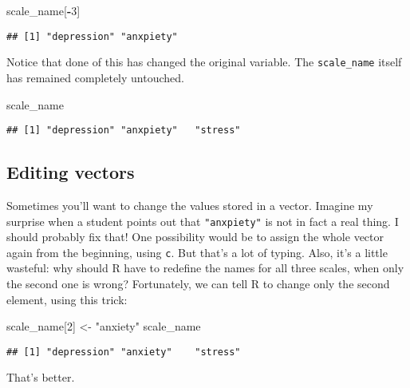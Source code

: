 \documentclass[]{book}
\newenvironment{Shaded}{\begin{snugshade}}{\end{snugshade}}
\newcommand{\DecValTok}[1]{\textcolor[rgb]{0.00,0.00,0.81}{#1}}
\newcommand{\NormalTok}[1]{#1}
\newcommand{\OperatorTok}[1]{\textcolor[rgb]{0.81,0.36,0.00}{\textbf{#1}}}
\newcommand{\StringTok}[1]{\textcolor[rgb]{0.31,0.60,0.02}{#1}}
\begin{document}
\begin{Shaded}
\begin{Highlighting}[]
\NormalTok{scale_name[}\OperatorTok{-}\DecValTok{3}\NormalTok{]}
\end{Highlighting}
\end{Shaded}

\begin{verbatim}
## [1] "depression" "anxpiety"
\end{verbatim}

Notice that done of this has changed the original variable. The \texttt{scale\_name} itself has remained completely untouched.

\begin{Shaded}
\begin{Highlighting}[]
\NormalTok{scale_name}
\end{Highlighting}
\end{Shaded}

\begin{verbatim}
## [1] "depression" "anxpiety"   "stress"
\end{verbatim}

\hypertarget{editing-vectors}{%
\subsection{Editing vectors}\label{editing-vectors}}

Sometimes you'll want to change the values stored in a vector. Imagine my surprise when a student points out that \texttt{"anxpiety"} is not in fact a real thing. I should probably fix that! One possibility would be to assign the whole vector again from the beginning, using \texttt{c}. But that's a lot of typing. Also, it's a little wasteful: why should R have to redefine the names for all three scales, when only the second one is wrong? Fortunately, we can tell R to change only the second element, using this trick:

\begin{Shaded}
\begin{Highlighting}[]
\NormalTok{scale_name[}\DecValTok{2}\NormalTok{] <-}\StringTok{ "anxiety"}
\NormalTok{scale_name}
\end{Highlighting}
\end{Shaded}

\begin{verbatim}
## [1] "depression" "anxiety"    "stress"
\end{verbatim}

That's better.
\end{document}
